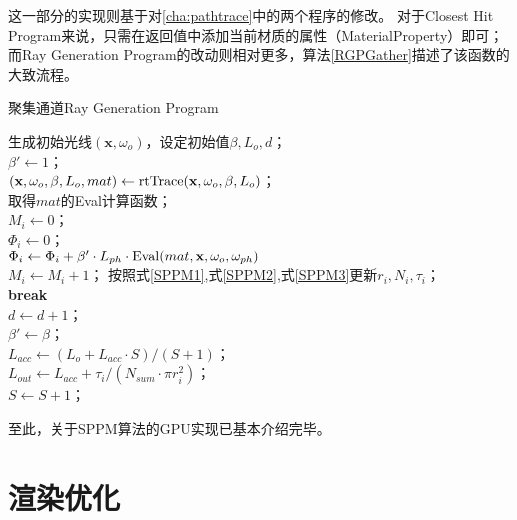 这一部分的实现则基于对\ref{cha:pathtrace}中的两个程序的修改。
对于Closest Hit Program来说，只需在返回值中添加当前材质的属性（MaterialProperty）即可；
而Ray Generation Program的改动则相对更多，算法\ref{RGPGather}描述了该函数的大致流程。

\begin{algorithm}
    \caption{聚集通道Ray Generation Program}
    \label{RGPGather}
    生成初始光线$(\textbf{x}, \omega_o)$，设定初始值$\beta,L_o,d$；\\
    $\beta' \leftarrow 1$；\\
    {
        $(\textbf{x}, \omega_o, \beta, L_o, mat) \leftarrow {\rm rtTrace}(\textbf{x}, \omega_o, \beta, L_o)$；\\
        {
            取得$mat$的Eval计算函数；\\
            $M_i \leftarrow 0$；\\
            $\Phi_i \leftarrow 0$；\\
            {
                $\Phi_i \leftarrow \Phi_i + \beta' \cdot L_{ph}\cdot {\rm Eval}(mat, \textbf{x}, \omega_o, \omega_{ph})$\\
                $M_i \leftarrow M_i+1$；
            }
            按照式\ref{SPPM1},式\ref{SPPM2},式\ref{SPPM3}更新$r_i, N_i,\tau_i$；\\
            \textbf{break}\\
        }
        $d \leftarrow d+1$； \\
        $\beta' \leftarrow \beta$；\\
    }
    $L_{acc} \leftarrow (L_o+L_{acc}\cdot S)/(S+1)$；\\
    $L_{out} \leftarrow L_{acc}+\tau_i/(N_{sum}\cdot \pi r_i^2)$；\\
    $S \leftarrow S+1$；
\end{algorithm}

至此，关于SPPM算法的GPU实现已基本介绍完毕。

\section{渲染优化}

